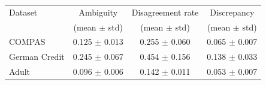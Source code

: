 \begin{tabular}{lccc}
\hline
Dataset & Ambiguity & Disagreement rate & Discrepancy \\
 & (mean $\pm$ std) & (mean $\pm$ std) & (mean $\pm$ std) \\
\hline
COMPAS & 0.125 $\pm$ 0.013 & 0.255 $\pm$ 0.060 & 0.065 $\pm$ 0.007 \\
German Credit & 0.245 $\pm$ 0.067 & 0.454 $\pm$ 0.156 & 0.138 $\pm$ 0.033 \\
Adult & 0.096 $\pm$ 0.006 & 0.142 $\pm$ 0.011 & 0.053 $\pm$ 0.007 \\
\hline
\end{tabular}